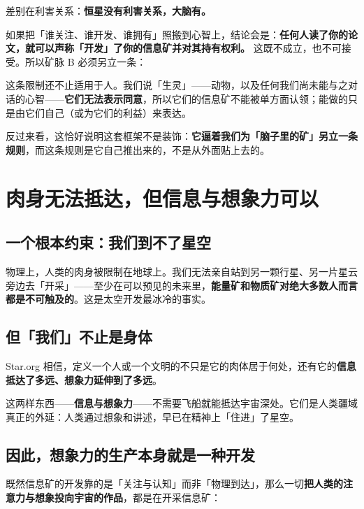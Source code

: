\documentclass[11pt,fontset=none]{ctexart}
\begin{document}
差别在利害关系：\textbf{恒星没有利害关系，大脑有。}

如果把「谁关注、谁开发、谁拥有」照搬到心智上，结论会是：\textbf{任何人读了你的论文，就可以声称「开发」了你的信息矿并对其持有权利。} 这既不成立，也不可接受。所以矿脉 B 必须另立一条：


这条限制还不止适用于人。我们说「生灵」——动物，以及任何我们尚未能与之对话的心智——\textbf{它们无法表示同意}，所以它们的信息矿不能被单方面认领；能做的只是由它们自己（或为它们的利益）来表达。

反过来看，这恰好说明这套框架不是装饰：\textbf{它逼着我们为「脑子里的矿」另立一条规则}，而这条规则是它自己推出来的，不是从外面贴上去的。

\section{肉身无法抵达，但信息与想象力可以}

\subsection{一个根本约束：我们到不了星空}

物理上，人类的肉身被限制在地球上。我们无法亲自站到另一颗行星、另一片星云旁边去「开采」——至少在可以预见的未来里，\textbf{能量矿和物质矿对绝大多数人而言都是不可触及的}。这是太空开发最冰冷的事实。

\subsection{但「我们」不止是身体}

Star.org 相信，定义一个人或一个文明的不只是它的肉体居于何处，还有它的\textbf{信息抵达了多远、想象力延伸到了多远}。


这两样东西——\textbf{信息与想象力}——不需要飞船就能抵达宇宙深处。它们是人类疆域真正的外延：人类通过想象和讲述，早已在精神上「住进」了星空。

\subsection{因此，想象力的生产本身就是一种开发}

既然信息矿的开发靠的是「关注与认知」而非「物理到达」，那么一切\textbf{把人类的注意力与想象投向宇宙的作品}，都是在开采信息矿：
\end{document}
